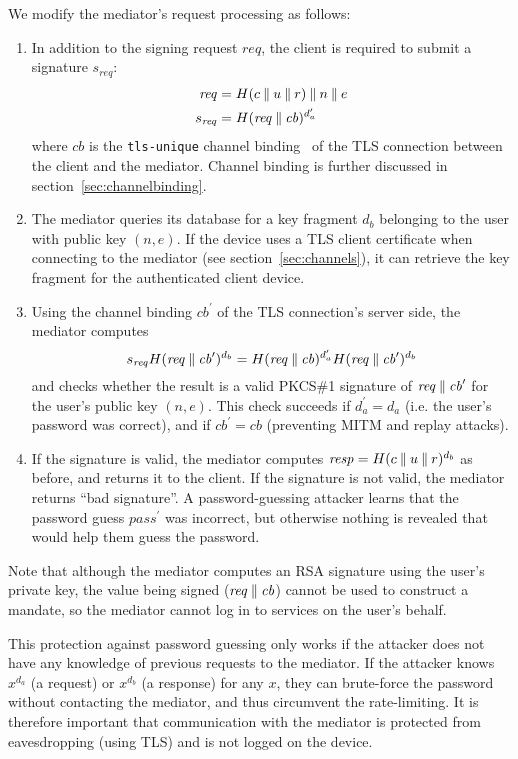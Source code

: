 We modify the mediator's request processing as follows:
\begin{enumerate}
\item In addition to the signing request $\mathit{req}$, the client is required to submit a
signature $s_\mathit{req}$:
\begin{align*}
    \mathit{req} &= H(c \mathbin{\|} u \mathbin{\|} r) \mathbin{\|} n \mathbin{\|} e \\
    s_\mathit{req} &= H(\mathit{req} \mathbin{\|} \mathit{cb})^{d_a^\prime}
\end{align*}
where $\mathit{cb}$ is the \texttt{tls-unique} channel binding~\cite{ChannelBinding}
of the TLS connection between the client and the mediator. Channel binding is further discussed in
section~\ref{sec:channelbinding}.
\item The mediator queries its database for a key fragment $d_b$ belonging to the user with public
key $(n, e)$. If the device uses a TLS client certificate when connecting to the mediator (see
section~\ref{sec:channels}), it can retrieve the key fragment for the authenticated client device.
\item Using the channel binding $\mathit{cb}^\prime$ of the TLS connection's server side, the
mediator computes
$$s_\mathit{req} H(\mathit{req} \mathbin{\|} \mathit{cb}^\prime)^{d_b} =
  H(\mathit{req} \mathbin{\|} \mathit{cb})^{d_a^\prime} H(\mathit{req} \mathbin{\|} \mathit{cb}^\prime)^{d_b}$$
and checks whether the result is a valid PKCS\#1 signature of
$\mathit{req} \mathbin{\|} \mathit{cb}^\prime$ for the user's public key $(n, e)$. This check succeeds if
$d_a^\prime = d_a$ (i.e. the user's password was correct), and if $\mathit{cb}^\prime = \mathit{cb}$
(preventing MITM and replay attacks).
\item If the signature is valid, the mediator computes
$\mathit{resp} = H(c \mathbin{\|} u \mathbin{\|} r)^{d_b}$ as before, and returns it to the client. If the
signature is not valid, the mediator returns ``bad signature''. A password-guessing attacker learns
that the password guess $\mathit{pass}^\prime$ was incorrect, but otherwise nothing is revealed that
would help them guess the password.
\end{enumerate}

Note that although the mediator computes an RSA signature using the user's private key, the value
being signed ($\mathit{req} \mathbin{\|} \mathit{cb}$) cannot be used to construct a mandate, so the
mediator cannot log in to services on the user's behalf.

This protection against password guessing only works if the attacker does not have any knowledge of
previous requests to the mediator. If the attacker knows $x^{d_a}$ (a request) or $x^{d_b}$ (a
response) for any $x$, they can brute-force the password without contacting the mediator, and thus
circumvent the rate-limiting.  It is therefore important that communication with the mediator is
protected from eavesdropping (using TLS) and is not logged on the device.

